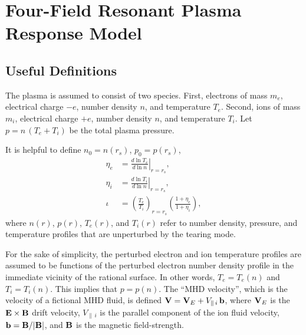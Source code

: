 \documentclass[12pt,prb,aps]{revtex4-1}
\begin{document}
\section{Four-Field Resonant Plasma Response Model}\label{sfour}
\subsection{Useful Definitions}
The plasma is assumed to consist of two species. First, electrons of mass $m_e$, electrical charge $-e$, 
number density $n$, and temperature $T_e$.  Second, ions of mass $m_i$, electrical charge $+e$,  
number density $n$, and temperature $T_i$. Let $p=n\,(T_e+T_i)$ be the total plasma pressure. 

It is helpful to define $n_0 = n(r_s)$, $p_0= p(r_s)$,
\begin{align}
\eta_e &=\left.\frac{d\ln T_e}{d\ln n}\right|_{r=r_s},\label{e211}\\[0.5ex]
\eta_i &= \left.\frac{d\ln T_i}{d\ln n}\right|_{r=r_s},\\[0.5ex]
\iota&= \left(\frac{T_e}{T_i}\right)_{r=r_s}\left(\frac{1+\eta_e}{1+\eta_i}\right),\label{e213}
\end{align}
where $n(r)$, $p(r)$, $T_e(r)$, and $T_i(r)$ refer to
number density, pressure, and temperature profiles that are unperturbed by the tearing mode. 

For the sake of simplicity, the perturbed electron and ion temperature profiles are assumed to be functions of
the perturbed electron number density profile in the immediate vicinity of the rational surface. In other words, $T_e=T_e(n)$ and $T_i=T_i(n)$. This
implies that $p=p(n)$. 
The ``MHD velocity'', which is the velocity of a
fictional MHD fluid, is defined ${\bf V}={\bf V}_E + V_{\parallel\,i}\,{\bf b}$, where ${\bf V}_E$ is the
${\bf E}\times{\bf B}$ drift velocity, $V_{\parallel\,i}$ is the parallel component of the ion fluid
velocity, ${\bf b}= {\bf B}/|{\bf B}|$, and ${\bf B}$ is the magnetic field-strength.
\end{document}
